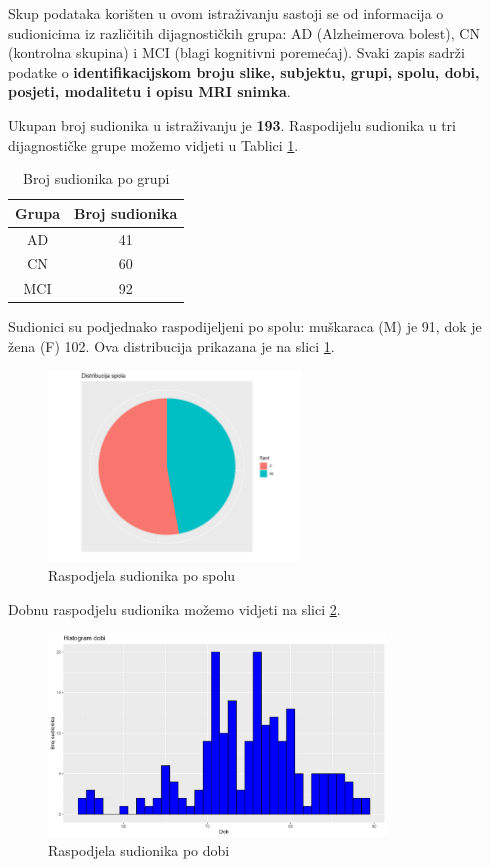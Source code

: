 \documentclass[zavrsnirad]{fer}
\begin{document}
Skup podataka korišten u ovom istraživanju sastoji se od informacija o sudionicima iz različitih dijagnostičkih grupa: AD (Alzheimerova bolest), CN (kontrolna skupina) i MCI (blagi kognitivni poremećaj). Svaki zapis sadrži podatke o \textbf{identifikacijskom broju slike, subjektu, grupi, spolu, dobi, posjeti, modalitetu i opisu MRI snimka}.

	
Ukupan broj sudionika u istraživanju je \textbf{193}. Raspodijelu sudionika u tri dijagnostičke grupe možemo vidjeti u Tablici \ref{tab:brojsudionikapogrupi}.

\begin{table}[ht]
	\centering
	\begin{tabular}{|c|c|}
		\hline
		\textbf{Grupa} & \textbf{Broj sudionika} \\
		\hline
		AD & 41 \\
		CN & 60 \\
		MCI & 92 \\
		\hline
	\end{tabular}
	\caption{Broj sudionika po grupi}
	\label{tab:brojsudionikapogrupi}
\end{table}

Sudionici su podjednako raspodijeljeni po spolu: muškaraca (M) je 91, dok je žena (F) 102. Ova distribucija prikazana je na slici \ref{fig:spol}.

\begin{figure}[h]
	\centering
	\includegraphics[width=0.6\textwidth]{Figures/pie_chart_spola.png}
	\caption{Raspodjela sudionika po spolu}
	\label{fig:spol}
\end{figure}

Dobnu raspodjelu sudionika možemo vidjeti na slici \ref{fig:dob}.
\begin{figure}[h]
	\centering
	\includegraphics[width=0.8\textwidth]{Figures/histogram_dobi.png}
	\caption{Raspodjela sudionika po dobi}
	\label{fig:dob}
\end{figure}
\end{document}
